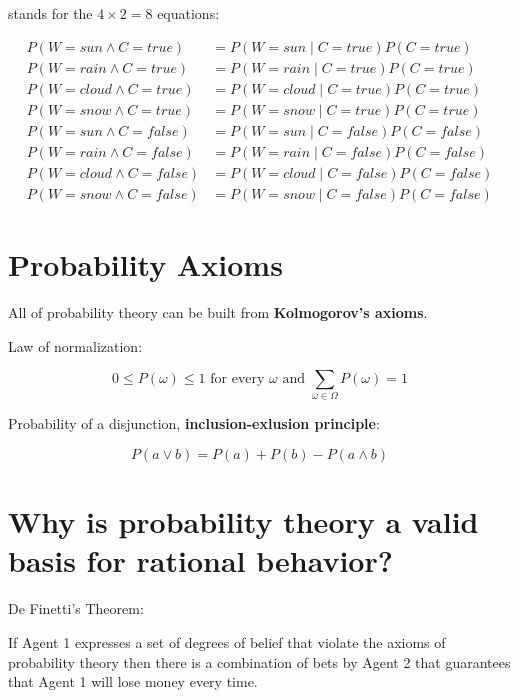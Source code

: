 \documentclass[11pt]{article}
\renewenvironment{quote}{\begin{shaded*}\begin{oldquote}}{\end{oldquote}\end{shaded*}}
\begin{document}
stands for the \(4 \times 2 = 8\) equations:

\begin{align*}
P(W = sun \land C = true)    &= P(W = sun  \mid  C = true) P(C = true) \\
P(W = rain \land C = true)   &= P(W = rain  \mid  C = true) P(C = true) \\
P(W = cloud \land C = true)  &= P(W = cloud  \mid  C = true) P(C = true) \\
P(W = snow \land C = true)   &= P(W = snow  \mid  C = true) P(C = true) \\
P(W = sun \land C = false)   &= P(W = sun  \mid  C = false) P(C = false) \\
P(W = rain \land C = false)  &= P(W = rain  \mid  C = false) P(C = false) \\
P(W = cloud \land C = false) &= P(W = cloud  \mid  C = false) P(C = false) \\
P(W = snow \land C = false)  &= P(W = snow  \mid  C = false) P(C = false)
\end{align*}
\section{Probability Axioms}
\label{sec:org13ca1f9}

All of probability theory can be built from \textbf{Kolmogorov's axioms}.

Law of normalization:

\begin{equation*}
0 \le P(\omega) \le 1 \text{ for every } \omega \text{ and } \sum_{\omega \in \Omega} P(\omega) = 1
\end{equation*}


Probability of a disjunction, \textbf{inclusion-exlusion principle}:

\begin{equation*}
P(a \lor b) = P(a) + P(b) - P(a \land b)
\end{equation*}
\section{Why is probability theory a valid basis for rational behavior?}
\label{sec:org9449e58}

De Finetti's Theorem:

\begin{quote}
If Agent 1 expresses a set of degrees of belief that violate the axioms of probability theory then there is a combination of bets by Agent 2 that guarantees that Agent 1 will lose money every time.
\end{quote}
\end{document}
